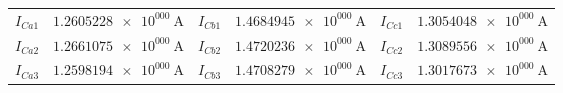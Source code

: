 \begin{table}[!ht]
{\begin{tabular}{cc|cc|cc}
            $I_{Ca1}$&$\SI{1.2605228e+000}{\A}$&  $I_{Cb1}$&$\SI{1.4684945e+000}{\A}$& $I_{Cc1}$&$\SI{1.3054048e+000}{\A}$ \\
            $I_{Ca2}$&$\SI{1.2661075e+000}{\A}$&  $I_{Cb2}$&$\SI{1.4720236e+000}{\A}$& $I_{Cc2}$&$\SI{1.3089556e+000}{\A}$ \\
            $I_{Ca3}$&$\SI{1.2598194e+000}{\A}$&  $I_{Cb3}$&$\SI{1.4708279e+000}{\A}$& $I_{Cc3}$&$\SI{1.3017673e+000}{\A}$ \\
            \bottomrule
        \end{tabular}}
\end{table}


\begin{table}[!ht]
    \caption{Valores de massas utilizadas para aplicação das cargas nos dispositivos de flexão e torção}
    \label{tab:MassasUtilizadas}
    \centering
\end{table}


